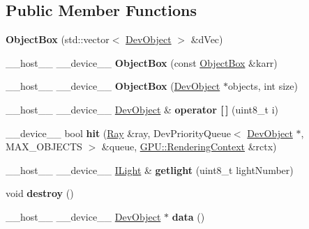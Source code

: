 \subsection*{Public Member Functions}
\begin{DoxyCompactItemize}
\item 
{\bfseries Object\+Box} (std\+::vector$<$ \hyperlink{class_dev_object}{Dev\+Object} $>$ \&d\+Vec)\hypertarget{class_object_box_aafbc94494fbc8d4cdb62f8cb1f051003}{}\label{class_object_box_aafbc94494fbc8d4cdb62f8cb1f051003}

\item 
\+\_\+\+\_\+host\+\_\+\+\_\+ \+\_\+\+\_\+device\+\_\+\+\_\+ {\bfseries Object\+Box} (const \hyperlink{class_object_box}{Object\+Box} \&karr)\hypertarget{class_object_box_aa87628a92437a186a84efabb697a972f}{}\label{class_object_box_aa87628a92437a186a84efabb697a972f}

\item 
\+\_\+\+\_\+host\+\_\+\+\_\+ \+\_\+\+\_\+device\+\_\+\+\_\+ {\bfseries Object\+Box} (\hyperlink{class_dev_object}{Dev\+Object} $\ast$objects, int size)\hypertarget{class_object_box_af145281cc745ea12a7d323154d77a4a2}{}\label{class_object_box_af145281cc745ea12a7d323154d77a4a2}

\item 
\+\_\+\+\_\+host\+\_\+\+\_\+ \+\_\+\+\_\+device\+\_\+\+\_\+ \hyperlink{class_dev_object}{Dev\+Object} \& {\bfseries operator \mbox{[}$\,$\mbox{]}} (uint8\+\_\+t i)\hypertarget{class_object_box_a93aa063210479567f9817f8fe28db3f0}{}\label{class_object_box_a93aa063210479567f9817f8fe28db3f0}

\item 
\+\_\+\+\_\+device\+\_\+\+\_\+ bool {\bfseries hit} (\hyperlink{class_ray}{Ray} \&ray, Dev\+Priority\+Queue$<$ \hyperlink{class_dev_object}{Dev\+Object} $\ast$, M\+A\+X\+\_\+\+O\+B\+J\+E\+C\+TS $>$ \&queue, \hyperlink{struct_g_p_u_1_1_rendering_context}{G\+P\+U\+::\+Rendering\+Context} \&rctx)\hypertarget{class_object_box_a2414c6dfe6ea1f11fadbb37f96b9a463}{}\label{class_object_box_a2414c6dfe6ea1f11fadbb37f96b9a463}

\item 
\+\_\+\+\_\+host\+\_\+\+\_\+ \+\_\+\+\_\+device\+\_\+\+\_\+ \hyperlink{class_i_light}{I\+Light} \& {\bfseries getlight} (uint8\+\_\+t light\+Number)\hypertarget{class_object_box_adf08ee78e3a68ed05a02d3d2a677f04c}{}\label{class_object_box_adf08ee78e3a68ed05a02d3d2a677f04c}

\item 
void {\bfseries destroy} ()\hypertarget{class_object_box_ac5a98f92851297ed083ea54dd539d129}{}\label{class_object_box_ac5a98f92851297ed083ea54dd539d129}

\item 
\+\_\+\+\_\+host\+\_\+\+\_\+ \+\_\+\+\_\+device\+\_\+\+\_\+ \hyperlink{class_dev_object}{Dev\+Object} $\ast$ {\bfseries data} ()\hypertarget{class_object_box_ac5d2891a8048d7a80e4941c1235a5e9f}{}\label{class_object_box_ac5d2891a8048d7a80e4941c1235a5e9f}

\end{DoxyCompactItemize}
